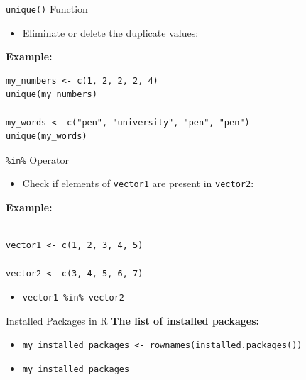 \documentclass{beamer}
\begin{document}
\begin{frame}[fragile]{\texttt{unique()} Function}
    \begin{itemize}
        \item Eliminate or delete the duplicate values:
    \end{itemize}

    \textbf{Example:}
    \begin{verbatim}
my_numbers <- c(1, 2, 2, 2, 4)
unique(my_numbers)

my_words <- c("pen", "university", "pen", "pen")
unique(my_words)
    \end{verbatim}
\end{frame}



\begin{frame}{\texttt{\%in\%} Operator}
    \begin{itemize}
        \item Check if elements of \texttt{vector1} are present in \texttt{vector2}:
    \end{itemize}

    \textbf{Example:}
    \begin{verbatim}
    
vector1 <- c(1, 2, 3, 4, 5)

vector2 <- c(3, 4, 5, 6, 7)
    \end{verbatim}
    \begin{itemize}
        \item \texttt{vector1 \%in\% vector2}
    \end{itemize}
\end{frame}  

\begin{frame}{Installed Packages in R}
    \textbf{The list of installed packages:}
    \begin{itemize}
        \item \texttt{my\_installed\_packages <- rownames(installed.packages())}
        \item \texttt{my\_installed\_packages}
    \end{itemize}
\end{frame}  
\end{document}
